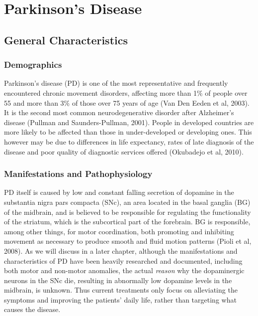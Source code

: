 \chapter{Parkinson's Disease}
\label{ch:pd}
\pagestyle{fancy}
\fancyhf{}
\fancyhead[OC]{\leftmark}
\fancyhead[EC]{\rightmark}
\cfoot{\thepage}


\section{General Characteristics}
\label{sec:generalCharacteristics}
\subsection{Demographics}
\label{subsec:demographics}

Parkinson's disease (\gls{PD}) is one of the most representative and frequently encountered chronic movement disorders, affecting more than 1\% of people over 55 and more than 3\% of those over 75 years of age (Van Den Eeden et al, 2003). It is the second most common neurodegenerative disorder after Alzheimer's disease (Pullman and Saunders-Pullman, 2001). People in developed countries are more likely to be affected than those in under-developed or developing ones. This however may be due to differences in life expectancy, rates of late diagnosis of the disease and poor quality of diagnostic services offered (Okubadejo et al, 2010). 



\subsection{Manifestations and Pathophysiology}
\label{subsec:manifestations}
PD itself is caused by low and constant falling secretion of dopamine in the substantia nigra pars compacta (\gls{SNc}), an area located in the basal ganglia (\gls{BG}) of the midbrain, and is believed to be responsible for regulating the functionality of the striatum, which is the subcortical part of the forebrain. \gls{BG} is responsible, among other things, for motor coordination, both promoting and inhibiting movement as necessary to produce smooth and fluid motion patterns (Pioli et al, 2008). As we will discuss in a later chapter, although the manifestations and characteristics of \gls{PD} have been heavily researched and documented, including both motor and non-motor anomalies, the actual \textit{reason} why the dopaminergic neurons in the \gls{SNc} die, resulting in abnormally low dopamine levels in the midbrain, is unknown. Thus current treatments only focus on alleviating the symptoms and improving the patients' daily life, rather than targeting what causes the disease.

